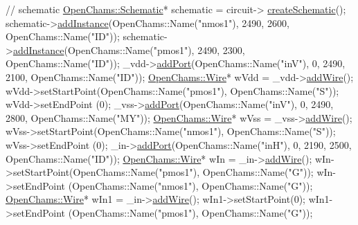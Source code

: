 \begin{DoxyCodeInclude}
    \textcolor{comment}{// schematic}
    \hyperlink{class_open_chams_1_1_schematic}{OpenChams::Schematic}* schematic = circuit->
      \hyperlink{class_open_chams_1_1_circuit_a57a79a9916df4512648bb195decb7250}{createSchematic}();
    schematic->\hyperlink{class_open_chams_1_1_schematic_ac7fc9f5cdf1e22c53d42e6606e1af8ef}{addInstance}(OpenChams::Name(\textcolor{stringliteral}{"nmos1"}), 2490, 2600, OpenChams::Name(\textcolor{stringliteral}{"ID"}));
    schematic->\hyperlink{class_open_chams_1_1_schematic_ac7fc9f5cdf1e22c53d42e6606e1af8ef}{addInstance}(OpenChams::Name(\textcolor{stringliteral}{"pmos1"}), 2490, 2300, OpenChams::Name(\textcolor{stringliteral}{"ID"}));
    \_vdd->\hyperlink{class_open_chams_1_1_net_af395a7c9d6f3c2b24500b91260873664}{addPort}(OpenChams::Name(\textcolor{stringliteral}{"inV"}), 0, 2490, 2100, OpenChams::Name(\textcolor{stringliteral}{"ID"}));
    \hyperlink{class_open_chams_1_1_wire}{OpenChams::Wire}* wVdd = \_vdd->\hyperlink{class_open_chams_1_1_net_a643a969f62770301b8b70ed63c36a55e}{addWire}();
    wVdd->setStartPoint(OpenChams::Name(\textcolor{stringliteral}{"pmos1"}), OpenChams::Name(\textcolor{stringliteral}{"S"}));
    wVdd->setEndPoint  (0);
    \_vss->\hyperlink{class_open_chams_1_1_net_af395a7c9d6f3c2b24500b91260873664}{addPort}(OpenChams::Name(\textcolor{stringliteral}{"inV"}), 0, 2490, 2800, OpenChams::Name(\textcolor{stringliteral}{"MY"}));
    \hyperlink{class_open_chams_1_1_wire}{OpenChams::Wire}* wVss = \_vss->\hyperlink{class_open_chams_1_1_net_a643a969f62770301b8b70ed63c36a55e}{addWire}();
    wVss->setStartPoint(OpenChams::Name(\textcolor{stringliteral}{"nmos1"}), OpenChams::Name(\textcolor{stringliteral}{"S"}));
    wVss->setEndPoint  (0);
    \_in->\hyperlink{class_open_chams_1_1_net_af395a7c9d6f3c2b24500b91260873664}{addPort}(OpenChams::Name(\textcolor{stringliteral}{"inH"}), 0, 2190, 2500, OpenChams::Name(\textcolor{stringliteral}{"ID"}));
    \hyperlink{class_open_chams_1_1_wire}{OpenChams::Wire}* wIn = \_in->\hyperlink{class_open_chams_1_1_net_a643a969f62770301b8b70ed63c36a55e}{addWire}();
    wIn->setStartPoint(OpenChams::Name(\textcolor{stringliteral}{"pmos1"}), OpenChams::Name(\textcolor{stringliteral}{"G"}));
    wIn->setEndPoint  (OpenChams::Name(\textcolor{stringliteral}{"nmos1"}), OpenChams::Name(\textcolor{stringliteral}{"G"}));
    \hyperlink{class_open_chams_1_1_wire}{OpenChams::Wire}* wIn1 = \_in->\hyperlink{class_open_chams_1_1_net_a643a969f62770301b8b70ed63c36a55e}{addWire}();
    wIn1->setStartPoint(0);
    wIn1->setEndPoint (OpenChams::Name(\textcolor{stringliteral}{"pmos1"}), OpenChams::Name(\textcolor{stringliteral}{"G"}));

\end{DoxyCodeInclude}
